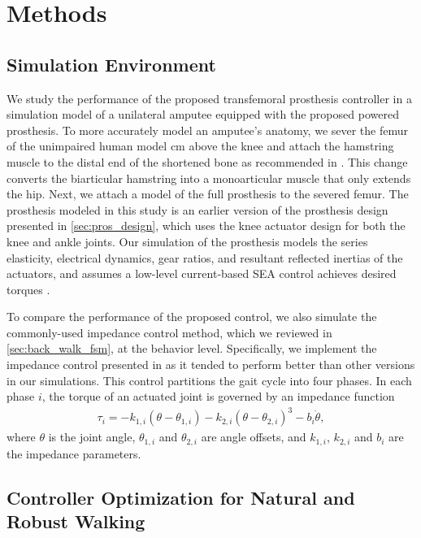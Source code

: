 \section{Methods}
\subsection{Simulation Environment}\label{sec:complete_simulation_environ}

We study the performance of the proposed transfemoral prosthesis controller in a
simulation model of a unilateral amputee equipped with the proposed powered
prosthesis. To more accurately model an amputee's anatomy, we sever the femur of
the unimpaired human model \unit[11]{cm} above the knee and attach the hamstring
muscle to the distal end of the shortened bone as recommended in
\citet{brown2012amputation}. This change converts the biarticular hamstring into
a monoarticular muscle that only extends the hip. Next, we attach a model of the
full prosthesis to the severed femur. The prosthesis modeled in this study is an
earlier version of the prosthesis design presented in
\cref{sec:pros_design}, which uses the knee actuator design for both the
knee and ankle joints. Our simulation of the prosthesis models the series
elasticity, electrical dynamics, gear ratios, and resultant reflected inertias
of the actuators, and assumes a low-level current-based SEA control achieves
desired torques \citep{pratt1995series}.

To compare the performance of the proposed control, we also simulate the
commonly-used impedance control method, which we reviewed in
\cref{sec:back_walk_fsm},  at the behavior level.
Specifically, we implement the impedance control presented in
\citet{sup2008design} as it tended to perform better than other versions in our
simulations. This control partitions the gait cycle into four phases. In each
phase $i$, the torque of an actuated joint is governed by an impedance function
\begin{align} 
    \tau_i = -k_{1,i} (\theta - \theta_{1,i}) - k_{2,i} 
        {(\theta - \theta_{2,i})}^3 - b_i \dot{\theta}, 
\end{align} 
where $\theta$ is the joint angle, $\theta_{1,i}$ and $\theta_{2,i}$ are angle
offsets, and $k_{1,i}$, $k_{2,i}$ and $b_i$ are the impedance parameters.  

\subsection{Controller Optimization for Natural and Robust
Walking}\label{sec:completed_comparison_opt}


